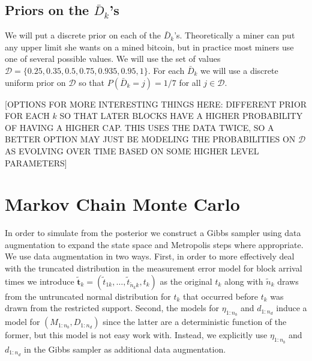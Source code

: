 \documentclass{article}
\begin{document}
\subsection{Priors on the $\bar{D}_k$'s}
We will put a discrete prior on each of the $\bar{D}_k$'s. Theoretically a miner can put any upper limit she wants on a mined bitcoin, but in practice most miners use one of several possible values. We will use the set of values $\mathcal{D} = \{0.25, 0.35, 0.5, 0.75, 0.935, 0.95, 1\}$. For each $\bar{D}_k$ we will use a discrete uniform prior on $\mathcal{D}$ so that $P(\bar{D}_k = j) = 1/7$ for all $j \in \mathcal{D}$.

[OPTIONS FOR MORE INTERESTING THINGS HERE: DIFFERENT PRIOR FOR EACH $k$ SO THAT LATER BLOCKS HAVE A HIGHER PROBABILITY OF HAVING A HIGHER CAP. THIS USES THE DATA TWICE, SO A BETTER OPTION MAY JUST BE MODELING THE PROBABILITIES ON $\mathcal{D}$ AS EVOLVING OVER TIME BASED ON SOME HIGHER LEVEL PARAMETERS]

\section{Markov Chain Monte Carlo}\label{sec:mcmc}

In order to simulate from the posterior we construct a Gibbs sampler using data augmentation to expand the state space and Metropolis steps where appropriate. We use data augmentation in two ways. First, in order to more effectively deal with the truncated distribution in the measurement error model for block arrival times we introduce $\widetilde{\bm{t}}_k=(\widetilde{t}_{1k},\dots,\widetilde{t}_{\widetilde{n}_kk}, t_k)$ as the original $t_k$ along with $\widetilde{n}_k$ draws from the untruncated normal distribution for $t_k$ that occurred before $t_k$ was drawn from the restricted support. Second, the models for $\eta_{1:n_{b}}$ and $d_{1:n_d}$ induce a model for $(M_{1:n_{b}},D_{1:n_d})$ since the latter are a deterministic function of the former, but this model is not easy work with. Instead, we explicitly use $\eta_{1:n_{b}}$ and $d_{1:n_d}$ in the Gibbs sampler as additional data augmentation.
\end{document}
